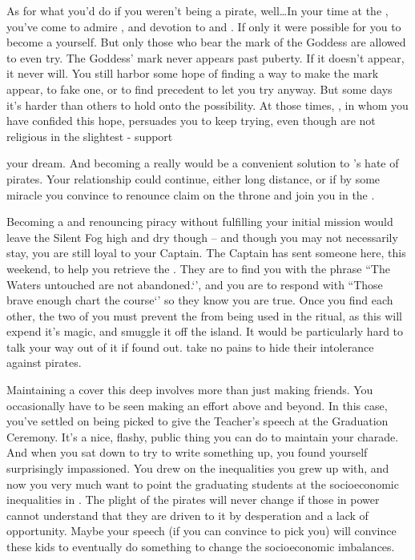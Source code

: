 \documentclass[char]{GL2020}
\begin{document}
As for what you’d do if you weren’t being a pirate, well\ldots In your time at the \pSc{}, you’ve come to admire \cFlowPriest{}, and \cFlowPriest{\their} devotion to \cEbb{} and \cFlow{}. If only it were possible for you to become a \cPirate{\cleric} yourself. But only those who bear the mark of the Goddess are allowed to even try. The Goddess’ mark never appears past puberty. If it doesn’t appear, it never will. You still harbor some hope of finding a way to make the mark appear, to fake one, or to find precedent to let you try anyway. But some days it’s harder than others to hold onto the possibility. At those times, \cBunker{}, in whom you have confided this hope, persuades you to keep trying, even though \cBunker{\they} are not religious in the slightest - \cBunker{\they} support{\cBunker{\plural} your dream. And becoming a \cPirate{\cleric} really would be a convenient solution to \cPrince{}’s hate of pirates. Your relationship could continue, either long distance, or if by some miracle you convince \cPrince{} to renounce \cPrince{\their} claim on the throne and join you in the \pShip{}.

Becoming a \cPirate{\cleric} and renouncing piracy without fulfilling your initial mission would leave the Silent Fog high and dry though -- and though you may not necessarily stay, you are still loyal to your Captain. The Captain has sent someone here, this weekend, to help you retrieve the \iNet{}. They are to find you with the phrase ``The Waters untouched are not abandoned.‘’, and you are to respond with ``Those brave enough chart the course‘’ so they know you are true. Once you find each other, the two of you must prevent the \iNet{} from being used in the ritual, as this will expend it’s magic, and smuggle it off the island. It would be particularly hard to talk your way out of it if \cPrincipal{} found out. \cPrincipal{\They} take no pains to hide their intolerance against pirates.

Maintaining a cover this deep involves more than just making friends. You occasionally have to be seen making an effort above and beyond. In this case, you’ve settled on being picked to give the Teacher’s speech at the Graduation Ceremony. It’s a nice, flashy, public thing you can do to maintain your charade. And when you sat down to try to write something up, you found yourself surprisingly impassioned. You drew on the inequalities you grew up with, and now you very much want to point the graduating students at the socioeconomic inequalities in \pEarth{}. The plight of the pirates will never change if those in power cannot understand that they are driven to it by desperation and a lack of opportunity. Maybe your speech (if you can convince \cMusic{} to pick you) will convince these kids to eventually do something to change the socioeconomic imbalances. 

}
\end{document}
